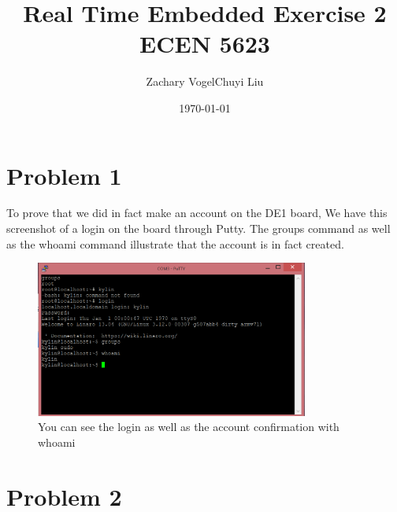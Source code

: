 \documentclass{article}
\author{Zachary Vogel\quad Chuyi Liu}
\title{Real Time Embedded Exercise 2\\ ECEN 5623}
\date{\today}
\begin{document}
\maketitle

\captionsetup{labelformat=empty}
\section*{Problem 1}
To prove that we did in fact make an account on the DE1 board, We have this screenshot of a login on the board through Putty. The groups command as well as the whoami command illustrate that the account is in fact created.
\begin{figure}[H]
    \centering
    \includegraphics[width=0.8\textwidth]{p1.png}
    \caption{You can see the login as well as the account confirmation with whoami}
\end{figure}
\section*{Problem 2}
\end{document}
